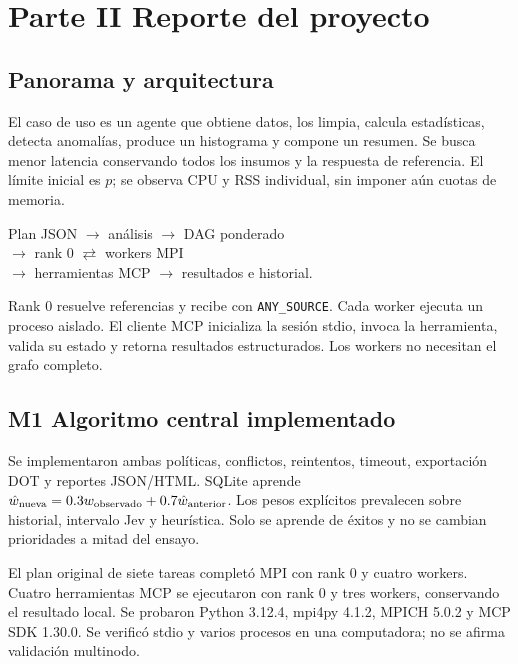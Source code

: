 \section{Parte II Reporte del proyecto}
\subsection{Panorama y arquitectura}
El caso de uso es un agente que obtiene datos, los limpia, calcula
estadísticas, detecta anomalías, produce un histograma y compone un
resumen. Se busca menor latencia conservando todos los insumos y la
respuesta de referencia. El límite inicial es $p$; se observa CPU
y RSS individual, sin imponer aún cuotas de memoria.
\begin{center}\small
Plan JSON $\rightarrow$ análisis $\rightarrow$ DAG ponderado\\
$\rightarrow$ rank 0 $\rightleftarrows$ workers MPI\\
$\rightarrow$ herramientas MCP $\rightarrow$ resultados e historial.
\end{center}
Rank 0 resuelve referencias y recibe con \texttt{ANY\_SOURCE}.
Cada worker ejecuta un proceso aislado. El cliente MCP inicializa
la sesión stdio, invoca la herramienta, valida su estado y retorna
resultados estructurados. Los workers no necesitan el grafo completo.

\subsection{M1 Algoritmo central implementado}
Se implementaron ambas políticas, conflictos, reintentos, timeout,
exportación DOT y reportes JSON/HTML. SQLite aprende
$\hat w_{\rm nueva}=0.3w_{\rm observado}+0.7\hat w_{\rm anterior}$.
Los pesos explícitos prevalecen sobre historial, intervalo Jev y
heurística. Solo se aprende de éxitos y no se cambian prioridades
a mitad del ensayo.

El plan original de siete tareas completó MPI con rank 0 y cuatro
workers. Cuatro herramientas MCP se ejecutaron con rank 0 y tres workers,
conservando el resultado local. Se probaron Python 3.12.4, mpi4py 4.1.2,
MPICH 5.0.2 y MCP SDK 1.30.0. Se verificó stdio y varios procesos
en una computadora; no se afirma validación multinodo.


